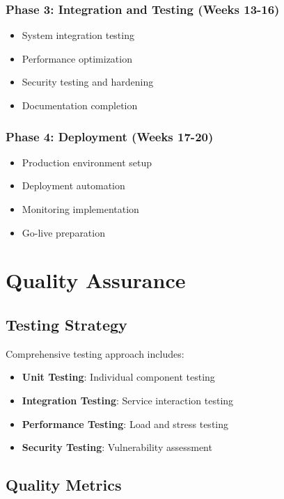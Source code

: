 \documentclass[11pt,a4paper,oneside]{article}
\begin{document}
\subsubsection{Phase 3: Integration and Testing (Weeks 13-16)}
\begin{itemize}
\item System integration testing
\item Performance optimization
\item Security testing and hardening
\item Documentation completion
\end{itemize}

\subsubsection{Phase 4: Deployment (Weeks 17-20)}
\begin{itemize}
\item Production environment setup
\item Deployment automation
\item Monitoring implementation
\item Go-live preparation
\end{itemize}

\section{Quality Assurance}

\subsection{Testing Strategy}

Comprehensive testing approach includes:

\begin{itemize}
\item \textbf{Unit Testing}: Individual component testing
\item \textbf{Integration Testing}: Service interaction testing
\item \textbf{Performance Testing}: Load and stress testing
\item \textbf{Security Testing}: Vulnerability assessment
\end{itemize}

\subsection{Quality Metrics}
\end{document}
